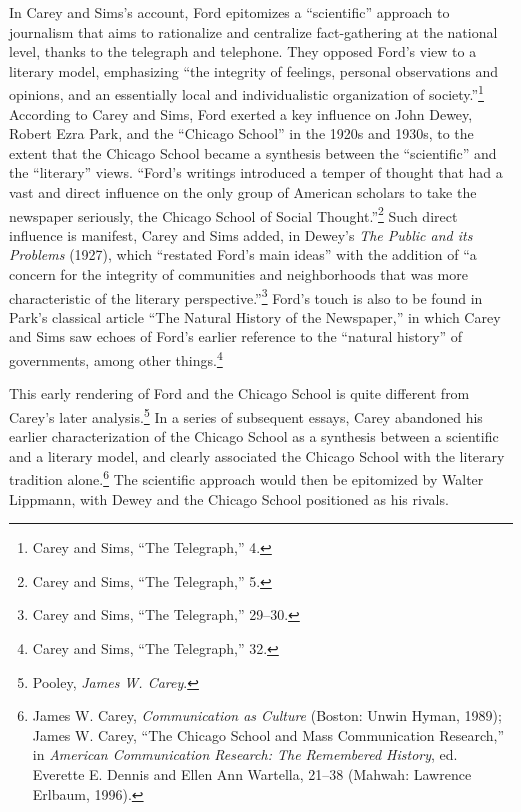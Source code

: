 \documentclass[openany,nobib]{tufte-book}
\begin{document}
In Carey and Sims's account, Ford epitomizes a ``scientific'' approach
to journalism that aims to rationalize and centralize fact-gathering at
the national level, thanks to the telegraph and telephone. They opposed
Ford's view to a literary model, emphasizing ``the integrity of
feelings, personal observations and opinions, and an essentially local
and individualistic organization of society.''\footnote{Carey and Sims,
  ``The Telegraph,'' 4.} According to Carey and Sims, Ford exerted a key
influence on John Dewey, Robert Ezra Park, and the ``Chicago School'' in
the 1920s and 1930s, to the extent that the Chicago School became a
synthesis between the ``scientific'' and the ``literary'' views.
``Ford's writings introduced a temper of thought that had a vast and
direct influence on the only group of American scholars to take the
newspaper seriously, the Chicago School of Social Thought.''\footnote{Carey
  and Sims, ``The Telegraph,'' 5.} Such direct influence is manifest,
Carey and Sims added, in Dewey's \emph{The Public and its Problems}
(1927), which ``restated Ford's main ideas'' with the addition of ``a
concern for the integrity of communities and neighborhoods that was more
characteristic of the literary perspective.''\footnote{Carey and Sims,
  ``The Telegraph,'' 29--30.} Ford's touch is also to be found in Park's
classical article ``The Natural History of the Newspaper,'' in which
Carey and Sims saw echoes of Ford's earlier reference to the ``natural
history'' of governments, among other things.\footnote{Carey and Sims,
  ``The Telegraph,'' 32.}

This early rendering of Ford and the Chicago School is quite different
from Carey's later analysis.\footnote{Pooley, \emph{James W. Carey}.} In
a series of subsequent essays, Carey abandoned his earlier
characterization of the Chicago School as a synthesis between a
scientific and a literary model, and clearly associated the Chicago
School with the literary tradition alone.\footnote{James W. Carey,
  \emph{Communication as Culture} (Boston: Unwin Hyman, 1989); James W.
  Carey, ``The Chicago School and Mass Communication Research,'' in
  \emph{American Communication Research: The Remembered History}, ed.
  Everette E. Dennis and Ellen Ann Wartella, 21--38 (Mahwah: Lawrence
  Erlbaum, 1996).} The scientific approach would then be epitomized by
Walter Lippmann, with Dewey and the Chicago School positioned as his
rivals.
\end{document}
